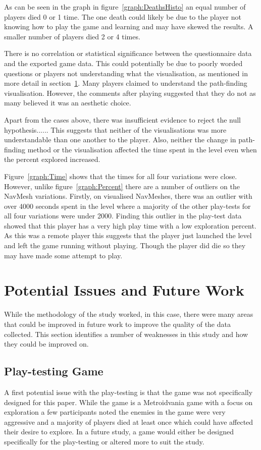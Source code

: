 \documentclass[journal]{IEEEtran}
\begin{document}
	As can be seen in the graph in figure~\ref{graph:DeathsHisto} an equal number of players died 0 or 1 time. The one death could likely be due to the player not knowing how to play the game and learning and may have skewed the results. A smaller number of players died 2 or 4 times. 
	
	There is no correlation or statistical significance between the questionnaire data and the exported game data. This could potentially be due to poorly worded questions or players not understanding what the visualisation, as mentioned in more detail in section~\ref{PotentialIssues}. Many players claimed to understand the path-finding visualisation. However, the comments after playing suggested that they do not as many believed it was an aesthetic choice.
	
	Apart from the cases above, there was insufficient evidence to reject the null hypothesis......  This suggests that neither of the visualisations was more understandable than one another to the player. Also, neither the change in path-finding method or the visualisation affected the time spent in the level even when the percent explored increased.
	
	Figure~\ref{graph:Time} shows that the times for all four variations were close. However, unlike figure~\ref{graph:Percent} there are a number of outliers on the NavMesh variations. Firstly, on visualised NavMeshes, there was an outlier with over 4000 seconds spent in the level where a majority of the other play-tests for all four variations were under 2000. Finding this outlier in the play-test data showed that this player has a very high play time with a low exploration percent. As this was a remote player this suggests that the player just launched the level and left the game running without playing. Though the player did die so they may have made some attempt to play.
	
	
	\section{Potential Issues and Future Work} \label{PotentialIssues}
	While the methodology of the study worked, in this case, there were many areas that could be improved in future work to improve the quality of the data collected. This section identifies a number of weaknesses in this study and how they could be improved on. 
	
	\subsection{Play-testing Game} 
	A first potential issue with the play-testing is that the game was not specifically designed for this paper. While the game is a Metroidvania game with a focus on exploration a few participants noted the enemies in the game were very aggressive and a majority of players died at least once which could have affected their desire to explore. In a future study, a game would either be designed specifically for the play-testing or altered more to suit the study.  
	
\end{document}
